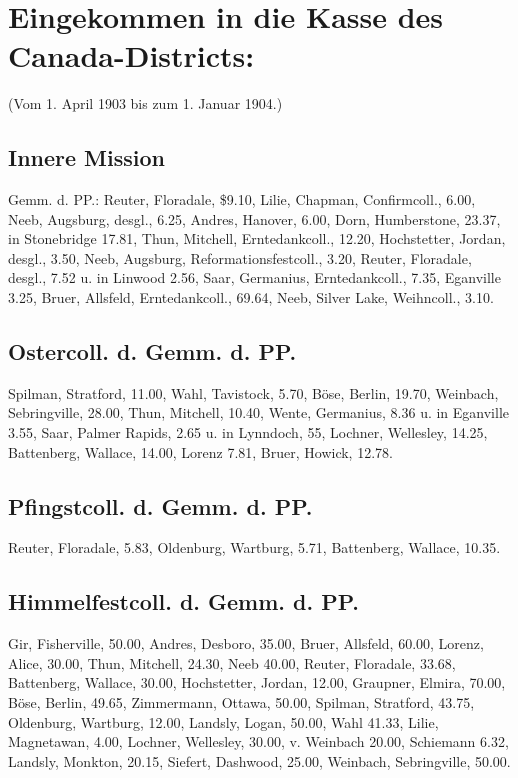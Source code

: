 \chapter[Kasse des Canada-Districts:]{Eingekommen in die Kasse des Canada-Districts:}

(Vom 1. April 1903 bis zum 1. Januar 1904.)

\section{Innere Mission}

Gemm. d. PP.: Reuter, Floradale, \$9.10, Lilie, Chapman, Confirmcoll., 6.00, Neeb, Augsburg, desgl., 6.25, Andres, Hanover, 6.00, Dorn, Humberstone, 23.37, in Stonebridge 17.81, Thun, Mitchell, Erntedankcoll., 12.20, Hochstetter, Jordan, desgl., 3.50, Neeb, Augsburg, Reformationsfestcoll., 3.20, Reuter, Floradale, desgl., 7.52 u. in Linwood 2.56, Saar, Germanius, Erntedankcoll., 7.35, Eganville 3.25, Bruer, Allsfeld, Erntedankcoll., 69.64, Neeb, Silver Lake, Weihncoll., 3.10.

\section{Ostercoll. d. Gemm. d. PP.}

Spilman, Stratford, 11.00, Wahl, Tavistock, 5.70, Böse, Berlin, 19.70, Weinbach, Sebringville, 28.00, Thun, Mitchell, 10.40, Wente, Germanius, 8.36 u. in Eganville 3.55, Saar, Palmer Rapids, 2.65 u. in Lynndoch, 55, Lochner, Wellesley, 14.25, Battenberg, Wallace, 14.00, Lorenz 7.81, Bruer, Howick, 12.78.

\section{Pfingstcoll. d. Gemm. d. PP.}

Reuter, Floradale, 5.83, Oldenburg, Wartburg, 5.71, Battenberg, Wallace, 10.35.

\section{Himmelfestcoll. d. Gemm. d. PP.}

Gir, Fisherville, 50.00, Andres, Desboro, 35.00, Bruer, Allsfeld, 60.00, Lorenz, Alice, 30.00, Thun, Mitchell, 24.30, Neeb 40.00, Reuter, Floradale, 33.68, Battenberg, Wallace, 30.00, Hochstetter, Jordan, 12.00, Graupner, Elmira, 70.00, Böse, Berlin, 49.65, Zimmermann, Ottawa, 50.00, Spilman, Stratford, 43.75, Oldenburg, Wartburg, 12.00, Landsly, Logan, 50.00, Wahl 41.33, Lilie, Magnetawan, 4.00, Lochner, Wellesley, 30.00, v. Weinbach 20.00, Schiemann 6.32, Landsly, Monkton, 20.15, Siefert, Dashwood, 25.00, Weinbach, Sebringville, 50.00.

